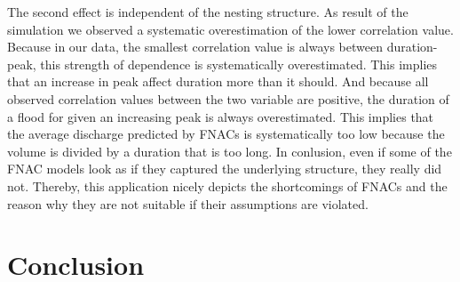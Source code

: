 \documentclass[
]{krantz}
\begin{document}
The second effect is independent of the nesting structure. As result of the simulation we observed a systematic
overestimation of the lower correlation value. Because in our data, the smallest correlation
value is always between duration-peak, this strength of dependence is systematically overestimated.
This implies that an increase in peak affect duration more than it should. And because
all observed correlation values between the two variable are positive, the duration of a flood
for given an increasing peak is always overestimated. This implies that the average discharge predicted by
FNACs is systematically too low because the volume is divided by a duration that is too long. In conlusion,
even if some of the FNAC models look as if they captured the underlying structure, they really did not.
Thereby, this application
nicely depicts the shortcomings of FNACs and the reason why they are
not suitable if their assumptions are violated.

\section{Conclusion}\label{conclusion}
\end{document}
